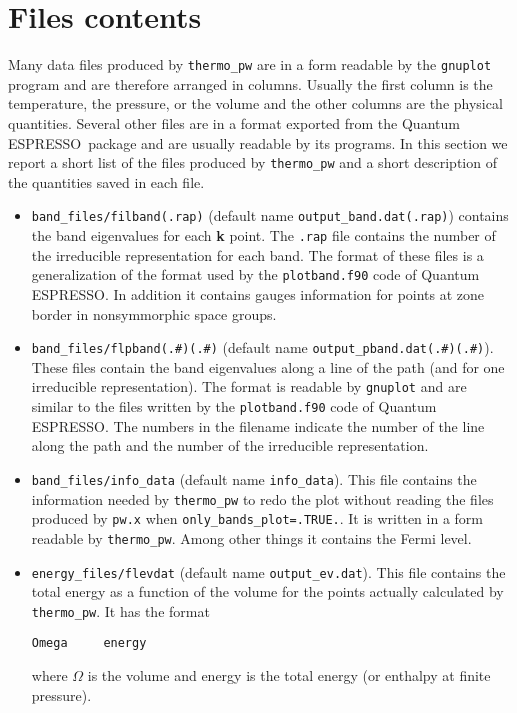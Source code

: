 \documentclass[12pt,a4paper,twoside]{report}
\def\qe{{\sc Quantum ESPRESSO}}
\begin{document}
\newpage
{\color{dark-blue}\chapter{Files contents}}
\color{black}

Many data files produced by \texttt{thermo\_pw} are in a form readable
by the \texttt{gnuplot} program and are therefore arranged in columns.
Usually the first column is the temperature, the pressure, or the volume
and the other columns are
the physical quantities. Several other files are in a format exported
from the \qe\ package and are usually readable by its 
programs. In this section we report a short list of the files produced
by \texttt{thermo\_pw} and a short description of the quantities 
saved in each file. 

\begin{itemize}

\item 
\texttt{band\_files/filband(.rap)} (default name 
\texttt{output\_band.dat(.rap)}) contains the band eigenvalues for each 
{\bf k} point. The \texttt{.rap} file contains the number of the irreducible
representation for each band. The format of these files is a generalization
of the format used by the \texttt{plotband.f90} code of \qe. In addition
it contains gauges information for points at zone border in nonsymmorphic
space groups.

\item 
\texttt{band\_files/flpband(.\#)(.\#)} 
(default name \texttt{output\_pband.dat(.\#)(.\#)}).
These files contain the band eigenvalues along a line of the path 
(and for one irreducible representation). 
The format is readable by \texttt{gnuplot} and are similar to the files written
by the \texttt{plotband.f90} code of \qe. The numbers in
the filename indicate the number of the line along the path and the number 
of the irreducible representation.

\item 
\texttt{band\_files/info\_data} (default name \texttt{info\_data}). This
file contains the information needed by \texttt{thermo\_pw}
to redo the plot without reading the files produced by \texttt{pw.x}
when \texttt{only\_bands\_plot=.TRUE.}. It is written
in a form readable by \texttt{thermo\_pw}. Among other things it
contains the Fermi level.

\item 
\texttt{energy\_files/flevdat} (default name \texttt{output\_ev.dat}).
This file contains the total energy as a function of the volume for the
points actually calculated by \texttt{thermo\_pw}. It has the format
\begin{verbatim}
Omega     energy
\end{verbatim}
where $\Omega$ is the volume and energy is the total energy (or enthalpy at
finite pressure).


\end{itemize}
\end{document}
